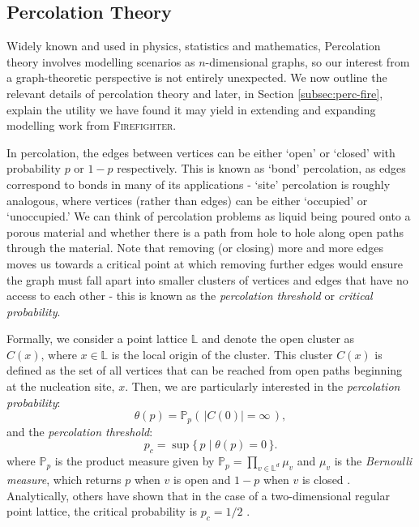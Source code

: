 \documentclass[../report.tex]{subfiles}
\begin{document}

\subsection{Percolation Theory}
\label{sec:perc}

Widely known and used in physics, statistics and mathematics, Percolation theory involves modelling scenarios as $n$-dimensional graphs, so our interest from a graph-theoretic perspective is not entirely unexpected. We now outline the relevant details of percolation theory and later, in Section \ref{subsec:perc-fire}, explain the utility we have found it may yield in extending and expanding modelling work from {\scshape Firefighter}.

In percolation, the edges between vertices can be either `open' or `closed' with probability $p$ or $1-p$ respectively. This is known as `bond' percolation, as edges correspond to bonds in many of its applications - `site' percolation is roughly analogous, where vertices (rather than edges) can be either `occupied' or `unoccupied.' We can think of percolation problems as liquid being poured onto a porous material and whether there is a path from hole to hole along open paths through the material. Note that removing (or closing) more and more edges moves us towards a critical point at which removing further edges would ensure the graph must fall apart into smaller clusters of vertices and edges that have no access to each other \cite{grimmett_1999} - this is known as the {\it percolation threshold} or {\it critical probability}. 

Formally, we consider a point lattice $\mathbb{L}$ and denote the open cluster as $C(x)\text{,~where~}x\in\mathbb{L}$ is the local origin of the cluster. This cluster $C(x)$ is defined as the set of all vertices that can be reached from open paths beginning at the nucleation site, $x$. Then, we are particularly interested in the \emph{percolation probability}:
$$
\theta(p) = \mathbb{P}_p(\,|C(0)|=\infty\,),
$$
and the \emph{percolation threshold}:
$$
p_c = \sup\{\,p \mid \theta(p)=0\,\}.
$$
where $\mathbb{P}_p$ is the product measure given by
$\displaystyle \mathbb{P}_p=\prod_{v\in\mathbb{L}^d}\mu_v$
and $\mu_v$ is the \emph{Bernoulli measure}, which returns $p$ when $v$ is open and $1-p$ when $v$ is closed \cite{klenke_2014}. Analytically, others have shown that in the case of a two-dimensional regular point lattice, the critical probability is $p_c=1/2$ \cite{kersten_1980}.
\end{document}
